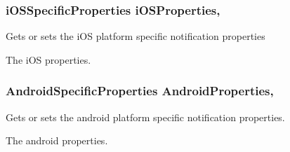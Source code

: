 \subsubsection[{i\+O\+S\+Properties}]{\setlength{\rightskip}{0pt plus 5cm}i\+O\+S\+Specific\+Properties i\+O\+S\+Properties\hspace{0.3cm}{\ttfamily [get]}, {\ttfamily [set]}}\label{class_voxel_busters_1_1_native_plugins_1_1_cross_platform_notification_abd422ec8f4bd9c46e8b4ce7ea5d80a9d}


Gets or sets the i\+O\+S platform specific notification properties 

The i\+O\+S properties.\hypertarget{class_voxel_busters_1_1_native_plugins_1_1_cross_platform_notification_a98a9f3e1981f5d4d3cff4067a9e0ce9a}{}
\subsubsection[{Android\+Properties}]{\setlength{\rightskip}{0pt plus 5cm}Android\+Specific\+Properties Android\+Properties\hspace{0.3cm}{\ttfamily [get]}, {\ttfamily [set]}}\label{class_voxel_busters_1_1_native_plugins_1_1_cross_platform_notification_a98a9f3e1981f5d4d3cff4067a9e0ce9a}


Gets or sets the android platform specific notification properties. 

The android properties.